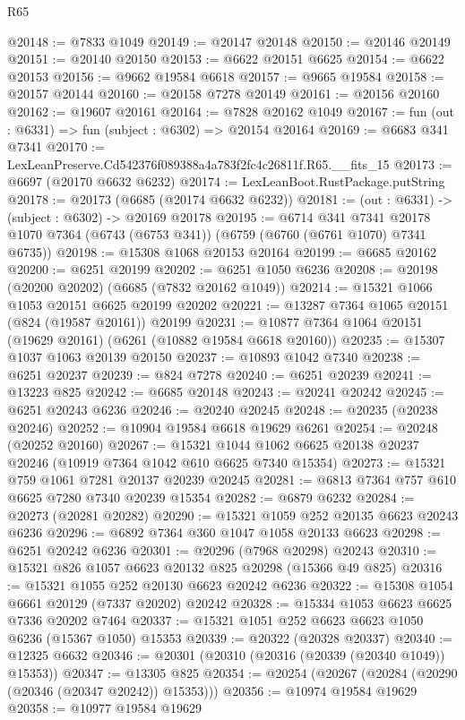 \begin{lexlean}{R65}
\begin{coremodule}
{@20148 := @7833 @1049
@20149 := @20147 @20148
@20150 := @20146 @20149
@20151 := @20140 @20150
@20153 := @6622 @20151 @6625
@20154 := @6622 @20153
@20156 := @9662 @19584 @6618
@20157 := @9665 @19584
@20158 := @20157 @20144
@20160 := @20158 @7278 @20149
@20161 := @20156 @20160
@20162 := @19607 @20161
@20164 := @7828 @20162 @1049
@20167 := fun (out : @6331) => fun (subject : @6302) => @20154 @20164
@20169 := @6683 @341 @7341
@20170 := LexLeanPreserve.Cd542376f089388a4a783f2fc4c26811f.R65.__fits_15
@20173 := @6697 (@20170 @6632 @6232)
@20174 := LexLeanBoot.RustPackage.putString
@20178 := @20173 (@6685 (@20174 @6632 @6232))
@20181 := (out : @6331) -> (subject : @6302) -> @20169 @20178
@20195 := @6714
    @341
    @7341
    @20178
    @1070
    @7364
    (@6743 (@6753 @341))
    (@6759 (@6760 (@6761 @1070) @7341 @6735))
@20198 := @15308 @1068 @20153 @20164
@20199 := @6685 @20162
@20200 := @6251 @20199
@20202 := @6251 @1050 @6236
@20208 := @20198 (@20200 @20202) (@6685 (@7832 @20162 @1049))
@20214 := @15321 @1066 @1053 @20151 @6625 @20199 @20202
@20221 := @13287 @7364 @1065 @20151 (@824 (@19587 @20161)) @20199
@20231 := @10877 @7364 @1064 @20151 (@19629 @20161) (@6261 (@10882 @19584 @6618 @20160))
@20235 := @15307 @1037 @1063 @20139 @20150
@20237 := @10893 @1042 @7340
@20238 := @6251 @20237
@20239 := @824 @7278
@20240 := @6251 @20239
@20241 := @13223 @825
@20242 := @6685 @20148
@20243 := @20241 @20242
@20245 := @6251 @20243 @6236
@20246 := @20240 @20245
@20248 := @20235 (@20238 @20246)
@20252 := @10904 @19584 @6618 @19629 @6261
@20254 := @20248 (@20252 @20160)
@20267 := @15321 @1044 @1062 @6625 @20138 @20237 @20246 (@10919 @7364 @1042 @610 @6625 @7340 @15354)
@20273 := @15321 @759 @1061 @7281 @20137 @20239 @20245
@20281 := @6813 @7364 @757 @610 @6625 @7280 @7340 @20239 @15354
@20282 := @6879 @6232
@20284 := @20273 (@20281 @20282)
@20290 := @15321 @1059 @252 @20135 @6623 @20243 @6236
@20296 := @6892 @7364 @360 @1047 @1058 @20133 @6623
@20298 := @6251 @20242 @6236
@20301 := @20296 (@7968 @20298) @20243
@20310 := @15321 @826 @1057 @6623 @20132 @825 @20298 (@15366 @49 @825)
@20316 := @15321 @1055 @252 @20130 @6623 @20242 @6236
@20322 := @15308 @1054 @6661 @20129 (@7337 @20202) @20242
@20328 := @15334 @1053 @6623 @6625 @7336 @20202 @7464
@20337 := @15321 @1051 @252 @6623 @6623 @1050 @6236 (@15367 @1050) @15353
@20339 := @20322 (@20328 @20337)
@20340 := @12325 @6632
@20346 := @20301 (@20310 (@20316 (@20339 (@20340 @1049)) @15353))
@20347 := @13305 @825
@20354 := @20254 (@20267 (@20284 (@20290 (@20346 (@20347 @20242)) @15353)))
@20356 := @10974 @19584 @19629
@20358 := @10977 @19584 @19629
}
\end{coremodule}
\end{lexlean}
